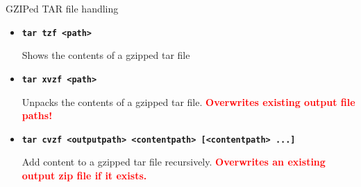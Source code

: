 \documentclass[aspectratio=1610]{beamer}
\newcommand\curtitle{}
\newenvironment{shells}[1]{
    \begin{tikzpicture}[codebox/.append style={text width=#1-18pt}]
        \coordinate (code);
}{
    \end{tikzpicture}
}
\newcommand\command[1]{\alert{\textbf{\texttt{#1}}}}
\begin{document}
\renewcommand\curtitle{GZIPed TAR file handling}

\begin{frame}[c]{\curtitle}
    \begin{itemize}[<+->]\setlength\itemsep{1em}
        \item \command{tar tzf <path>}

            Shows the contents of a gzipped tar file
        \item \command{tar xvzf <path>}

            Unpacks the contents of a gzipped tar file. \textcolor{red}{\textbf{Overwrites existing
            output file paths!}}
        \item \command{tar cvzf <outputpath> <contentpath> [<contentpath> ...]}

            Add content to a gzipped tar file recursively. \textcolor{red}{\textbf{Overwrites an existing
            output zip file if it exists.}}

    \end{itemize}
\end{frame}



\end{document}

